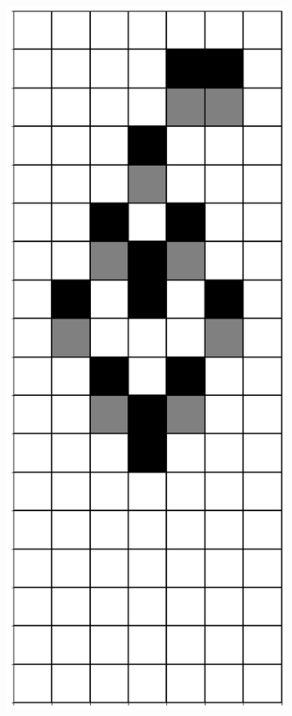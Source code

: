 \documentclass[12pt]{article}
\numberwithin{figure}{section} %
\begin{document}
\begin{figure}[H]
\begin{subfigure}{0.18\textwidth}
     		\subcaption{}
   	\end{subfigure}
        	\begin{subfigure}{0.18\textwidth}
     		\centering
     		\includegraphics[width=\linewidth]{Section4/18.4}
     		\subcaption{}
   	\end{subfigure}
      	\newline
   	\setcounter{subfigure}{0}


\end{figure}
\end{document}
